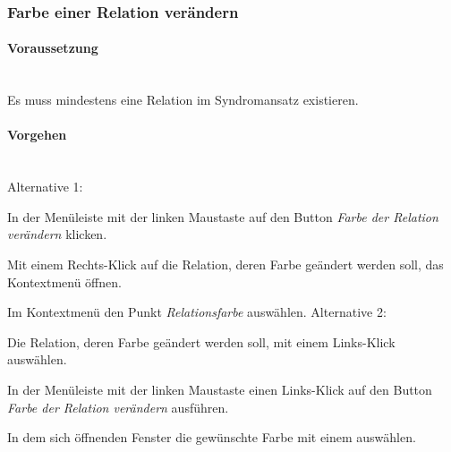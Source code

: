 \documentclass[enabledeprecatedfontcommands,fontsize=11pt,paper=a4,twoside]{scrartcl}
\newcommand*{\condition}{\paragraph{Voraussetzung}$\;$ \vspace{0.2cm}\\}
\newcommand*{\actions}{\paragraph{Vorgehen} $\;$\vspace{0.2cm}\\}
\newcommand*{\aOne}{\textcolor{bbe}{Alternative 1:}}
\newcommand*{\aTwo}{\textcolor{bbe}{Alternative 2:}}
\let\origenumerate\enumerate
\let\origendenumerate\endenumerate
\renewenvironment{enumerate}{\origenumerate \addtolength{\itemsep}{-10.0pt}}{\origendenumerate}
\begin{document}
\subsubsection{Farbe einer Relation verändern}
		\condition
		Es muss mindestens eine Relation im Syndromansatz existieren.
		\actions
		\aOne
		\begin{enumerate}
			\item In der Menüleiste mit der linken Maustaste auf den Button \textit{Farbe der Relation verändern} klicken.
			\item Mit einem Rechts-Klick auf die Relation, deren Farbe geändert werden soll, das Kontextmenü öffnen.
			\item Im Kontextmenü den Punkt \textit{Relationsfarbe} auswählen.
		\end{enumerate}
		\aTwo
		\begin{enumerate}
			\item Die Relation, deren Farbe geändert werden soll, mit einem Links-Klick auswählen.
			\item In der Menüleiste mit der linken Maustaste einen Links-Klick auf den Button \textit{Farbe der Relation verändern} ausführen.
			\item In dem sich öffnenden Fenster die gewünschte Farbe mit einem auswählen. \\
		\end{enumerate}	
		
\end{document}
